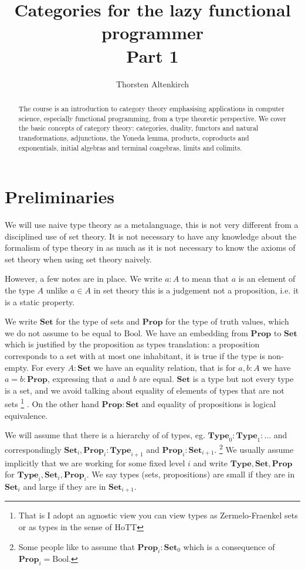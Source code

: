 \documentclass{article}
\title{Categories for the lazy functional programmer\\
Part 1}
\author{Thorsten Altenkirch}
\newcommand{\Type}{\mathbf{Type}}
\newcommand{\Prop}{\mathbf{Prop}}
\newcommand{\Set}{\mathbf{Set}}
\newcommand{\Bool}{\mathrm{Bool}}
\begin{document}
\maketitle

\begin{abstract}
  The course is an introduction to category theory emphasising applications in computer science, especially functional programming, from a type theoretic perspective. We cover the basic concepts of category theory: categories, duality, functors and natural transformations, adjunctions, the Yoneda lemma, products, coproducts and exponentials, initial algebras and terminal coagebras,  limits and colimits. %
\end{abstract}

\tableofcontents

\section{Preliminaries}
\label{sec:prelim}

We will use naive type theory as a metalanguage, this is not very different from a disciplined use of set theory. It is not necessary to have any knowledge about the formalism of type theory in as much as it is not necessary to know the axioms of set theory when using set theory naively.

However, a few notes are in place. We write $a : A$ to mean that $a$ is an element of the type $A$ unlike $a \in A$ in set theory this is a judgement not a proposition, i.e. it is a static property.

We write $\Set$ for the type of sets and $\Prop$ for the type of truth values, which we do not assume to be equal to  $\Bool$. We have an embedding from $\Prop$ to $\Set$ which is justified by the proposition as types translation: a proposition corresponds to a set with at most one inhabitant, it  is true if the type is non-empty. For every $A:\Set$ we have an equality relation, that is for $a,b : A$ we have $a = b : \Prop$, expressing that $a$ and $b$ are equal. $\Set$ is a type but not every type is a set, and we avoid talking about equality of elements of types that are not sets%
\footnote{That is I adopt an agnostic view you can view types as Zermelo-Fraenkel sets or as types in the sense of HoTT}%
. On the other hand $\Prop : \Set$ and equality of propositions is logical equivalence. 

We will assume that there is a hierarchy of of types, eg. $\Type_0 : \Type_1 : \dots$ and correspondingly $\Set_i,\Prop_i : \Type_{i+1}$ and $\Prop_i : \Set_{i+1}$.
\footnote{Some people like to assume that $\Prop_i : \Set_0$ which is a consequence of $\Prop_i = \Bool$.}
We usually assume implicitly that we are working for some fixed level $i$ and write $\Type,\Set,\Prop$ for $\Type_i,\Set_i,\Prop_i$. We say types (sets, propositions) are small if they are in $\Set_i$ and large if they are in $\Set_{i+1}$.
\end{document}

